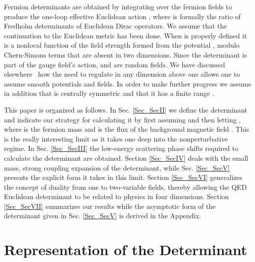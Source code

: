 \documentclass[a4paper,twocolumn,showpacs,preprintnumbers,amsmath,amssymb]{revtex4}
\providecommand{\slashletter}[1]{\ensuremath{\kern+0.1em /\kern-0.65em #1}}
\begin{document}
Fermion determinants are obtained by integrating over the fermion
fields to produce the one-loop effective Euclidean action
\coordHE{}, where \coordHE{} is formally the ratio
\myHighlight{$det(\slashletter{P} - e\slashletter{A} + m)/det(\slashletter{P} + m)$}\coordHE{}
of Fredholm determinants of Euclidean Dirac operators. We assume that
the continuation to the Euclidean metric has been done. When \coordHE{} is
properly defined it is a nonlocal function of the field strength
\coordHE{} formed from the potential \coordHE{} , modulo Chern-Simons
terms that are absent in two dimensions. Since the determinant is part
of the gauge field's action, \coordHE{} and \coordHE{} are random
fields. We have discussed elsewhere~\cite{Fry95,Fry92,Fry96} how the
need to regulate in any dimension above one allows one to assume
smooth potentials and fields. In order to make further progress we
assume in addition that \coordHE{} is centrally symmetric and that
it has a finite range \coordHE{}.

This paper is organized as follows. In Sec. \ref{Sec_SecII} we define
the determinant and indicate our strategy for calculating it by first
assuming \coordHE{} and then letting \coordHE{}, where \coordHE{} is the
fermion mass and \myHighlight{$\Phi$}\coordHE{} is the flux of the background magnetic field
\coordHE{}. This is the really interesting limit as it takes one deep
into the nonperturbative regime. In Sec. \ref{Sec_SecIII} the
low-energy scattering phase shifts required to calculate the
determinant are obtained. Section \ref{Sec_SecIV} deals with the small
mass, strong coupling expansion of the determinant, while
Sec. \ref{Sec_SecV} presents the explicit form it takes in this
limit. Section \ref{Sec_SecVI} generalizes the concept of duality from
one to two-variable fields, thereby allowing the QED\coordHE{} Euclidean
determinant to be related to physics in four dimensions. Section
\ref{Sec_SecVII} summarizes our results while the asymptotic form of
the determinant given in Sec. \ref{Sec_SecV} is derived in the
Appendix.




\section{\label{Sec_SecII}
Representation of the Determinant}
\end{document}
